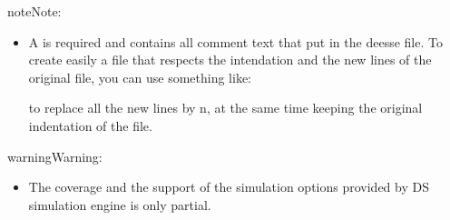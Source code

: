 \documentclass[letterpaper,10pt,english]{sphinxmanual}
\begin{document}
\begin{sphinxadmonition}{note}{Note:}\begin{itemize}
\item {} 
A  is required and contains all comment text
that put in the deesse  file. To create easily a  file that
respects the intendation and the new lines of the original  file,
you can use something like:

\begin{sphinxVerbatim}[commandchars=\\\{\}]
   
\end{sphinxVerbatim}

to replace all the new lines by n, at the same time keeping the
original indentation of the file.

\end{itemize}
\end{sphinxadmonition}

\begin{sphinxadmonition}{warning}{Warning:}\begin{itemize}
\item {} 
The coverage and the support of the simulation options provided
by DS simulation engine is only partial.

\end{itemize}
\end{sphinxadmonition}
\end{document}
